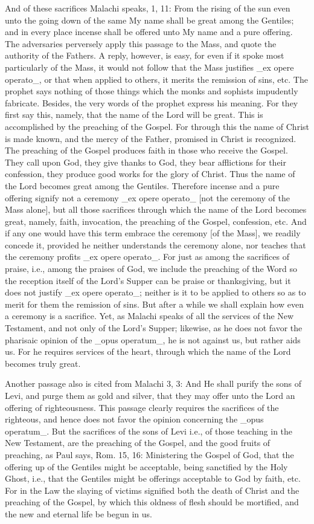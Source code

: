 And of these sacrifices Malachi speaks, 1, 11: From the rising of the
sun even unto the going down of the same My name shall be great among
the Gentiles; and in every place incense shall be offered unto My
name and a pure offering.  The adversaries perversely apply this
passage to the Mass, and quote the authority of the Fathers.  A reply,
however, is easy, for even if it spoke most particularly of the Mass,
it would not follow that the Mass justifies _ex opere operato_, or
that when applied to others, it merits the remission of sins, etc.
The prophet says nothing of those things which the monks and sophists
impudently fabricate.  Besides, the very words of the prophet express
his meaning.  For they first say this, namely, that the name of the
Lord will be great.  This is accomplished by the preaching of the
Gospel.  For through this the name of Christ is made known, and the
mercy of the Father, promised in Christ is recognized.  The preaching
of the Gospel produces faith in those who receive the Gospel.  They
call upon God, they give thanks to God, they bear afflictions for
their confession, they produce good works for the glory of Christ.
Thus the name of the Lord becomes great among the Gentiles.
Therefore incense and a pure offering signify not a ceremony _ex
opere operato_ [not the ceremony of the Mass alone], but all those
sacrifices through which the name of the Lord becomes great, namely,
faith, invocation, the preaching of the Gospel, confession, etc. And
if any one would have this term embrace the ceremony [of the Mass],
we readily concede it, provided he neither understands the ceremony
alone, nor teaches that the ceremony profits _ex opere operato_.  For
just as among the sacrifices of praise, i.e., among the praises of
God, we include the preaching of the Word so the reception itself of
the Lord's Supper can be praise or thanksgiving, but it does not
justify _ex opere operato_; neither is it to be applied to others so
as to merit for them the remission of sins.  But after a while we
shall explain how even a ceremony is a sacrifice.  Yet, as Malachi
speaks of all the services of the New Testament, and not only of the
Lord's Supper; likewise, as he does not favor the pharisaic opinion
of the _opus operatum_, he is not against us, but rather aids us.
For he requires services of the heart, through which the name of the
Lord becomes truly great.

Another passage also is cited from Malachi 3, 3: And He shall purify
the sons of Levi, and purge them as gold and silver, that they may
offer unto the Lord an offering of righteousness.  This passage
clearly requires the sacrifices of the righteous, and hence does not
favor the opinion concerning the _opus operatum_.  But the sacrifices
of the sons of Levi i.e., of those teaching in the New Testament, are
the preaching of the Gospel, and the good fruits of preaching, as
Paul says, Rom. 15, 16: Ministering the Gospel of God, that the
offering up of the Gentiles might be acceptable, being sanctified by
the Holy Ghost, i.e., that the Gentiles might be offerings acceptable
to God by faith, etc. For in the Law the slaying of victims signified
both the death of Christ and the preaching of the Gospel, by which
this oldness of flesh should be mortified, and the new and eternal
life be begun in us.

